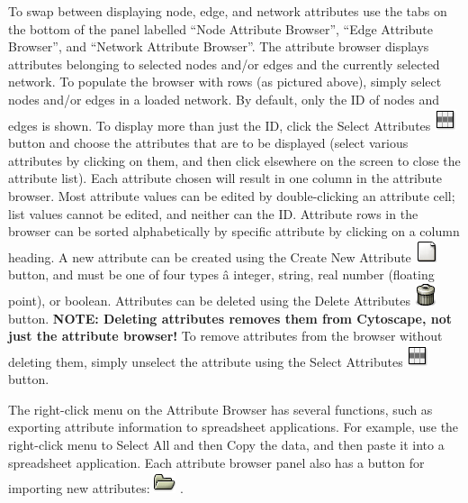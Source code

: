  To swap between displaying node, edge, and network attributes use the tabs on
the bottom of the panel labelled ``Node Attribute Browser'', ``Edge Attribute
Browser'', and ``Network Attribute Browser''. The attribute browser displays
attributes belonging to selected nodes and/or edges and the currently selected
network. To populate the browser with rows (as pictured above), simply select
nodes and/or edges in a loaded network. By default, only the ID of nodes and
edges is shown. To display more than just the ID, click the Select Attributes
\includegraphics[scale=1]{images/attributes_select_icon.png}  button and choose
the attributes that are to be displayed (select various attributes by clicking
on them, and then click elsewhere on the screen to close the attribute list).
Each attribute chosen will result in one column in the attribute browser. Most
attribute values can be edited by double-clicking an attribute cell; list
values cannot be edited, and neither can the ID. Attribute rows in the browser
can be sorted alphabetically by specific attribute by clicking on a column
heading. A new attribute can be created using the Create New Attribute
\includegraphics[scale=1]{images/attributes_new_icon.png}  button, and must be
one of four types \^a integer, string, real number (floating point), or
boolean. Attributes can be deleted using the Delete Attributes
\includegraphics[scale=1]{images/attributes_delete_icon.png}  button.
\textbf{NOTE: Deleting attributes removes them from Cytoscape, not just the
attribute browser!} To remove attributes from the browser without deleting
them, simply unselect the attribute using the Select Attributes
\includegraphics[scale=1]{images/attributes_select_icon.png}  button. 


 The right-click menu on the Attribute Browser has several functions, such as
exporting attribute information to spreadsheet applications. For example, use
the right-click menu to Select All and then Copy the data, and then paste it
into a spreadsheet application. Each attribute browser panel also has a button
for importing new attributes:
\includegraphics[scale=1]{images/attributes_import_icon.png}  . 


